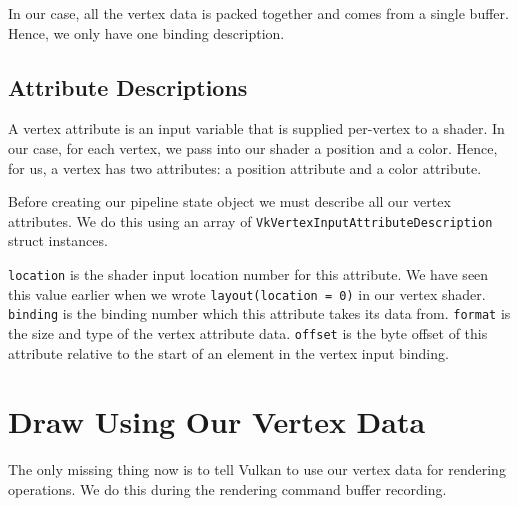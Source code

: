 In our case, all the vertex data is packed together and comes from a single buffer.
Hence, we only have one binding description.

\begin{minipage}{\linewidth}{\noindent}
    
\end{minipage}

\subsection{Attribute Descriptions}

A vertex attribute is an input variable that is supplied per-vertex to a shader.
In our case, for each vertex, we pass into our shader a position and a color.
Hence, for us, a vertex has two attributes: a position attribute and a
color attribute.

Before creating our pipeline state object we must describe all our
vertex attributes.
We do this using an array of \texttt{VkVertexInputAttributeDescription} struct
instances.

\begin{minipage}{\linewidth}{\noindent}
    
\end{minipage}

\texttt{location} is the shader input location number for this attribute.
We have seen this value earlier when we wrote \texttt{layout(location = 0)}
in our vertex shader.
\texttt{binding} is the binding number which this attribute takes its data from.
\texttt{format} is the size and type of the vertex attribute data.
\texttt{offset} is the byte offset of this attribute relative to the start of
an element in the vertex input binding.

\section{Draw Using Our Vertex Data}

The only missing thing now is to tell Vulkan to use our vertex data
for rendering operations.
We do this during the rendering command buffer recording.

\begin{minipage}{\linewidth}{\noindent}
    
\end{minipage}
